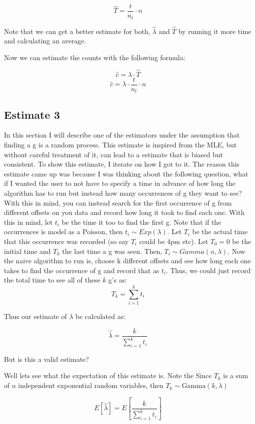 \documentclass[a4paper]{article}
\begin{document}
$$\hat{T} = \frac{t}{n_t} \cdot n$$

Note that we can get a better estimate for both, $\hat{\lambda}$ and $\hat{T}$ by running it more time and calculating an average.


Now we can estimate the counts with the following formula:

$$\hat{c} = \lambda \cdot \hat{T} $$
$$\hat{c}  = \lambda \cdot \frac{t}{n_t} \cdot n$$

\subsection{Estimate 3}

In this section I will describe one of the estimators under the assumption that finding a g is a random process.
This estimate is inspired from the MLE, but without careful treatment of it, can lead to a estimate that is biased but consistent.
To show this estimate, I iterate on how I got to it.
The reason this estimate came up was because I was thinking about the following question, what if I wanted the user to not have to specify a time in advance of how long the algorithm has to run but instead how many occurrences of g they want to see?
With this in mind, you can instead search for the first occurrence of g from different offsets on you data and record how long it took to find each one.
With this in mind, let $t_i$ be the time it too to find the first g.
Note that if the occurrences is model as a Poisson, then $t_i \sim Exp(\lambda)$.
Let $T_i$ be the actual time that this occurrence was recorded (so say $T_i$ could be 4pm etc).
Let $T_0 = 0$ be the initial time and $T_k$ the last time a g was seen.
Then, $T_i \sim Gamma(n, \lambda)$.
Now the naive algorithm to run is, choose k different offsets and see how long each one takes to find the occurrence of g and record that as $t_i$.
Thus, we could just record the total time to see all of these $k$ g's as: 
$$ T_k = \sum^{k}_{i=1} t_i$$

Thus our estimate of $\lambda$ be calculated as:

$$\hat{\lambda} = \frac{k}{\sum^{k}_{i=1} t_i}$$

But is this a valid estimate?

Well lets see what the expectation of this estimate is.
Note the Since $T_k$ is a sum of $n$ independent exponential random variables, then $T_k\sim\mathrm{Gamma}(k,\lambda)$

$$E[\hat{\lambda}] = E[ \frac{k}{ \sum^{k}_{i=1} t_i } ]$$
\end{document}
